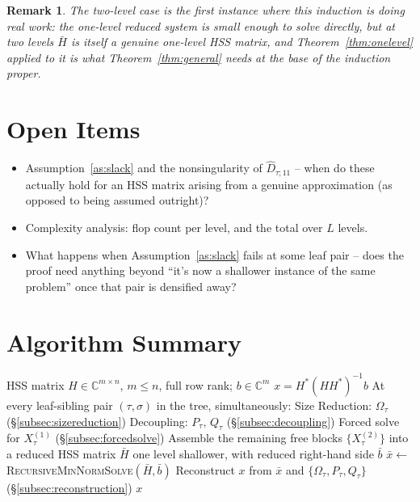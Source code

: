 \documentclass[11pt]{article}
\newtheorem{remark}{Remark}
\begin{document}
\begin{remark}
The two-level case is the first instance where this induction is doing real
work: the one-level reduced system is small enough to solve directly, but at
two levels $\bar H$ is itself a genuine one-level HSS matrix, and
Theorem~\ref{thm:onelevel} applied to it is what Theorem~\ref{thm:general}
needs at the base of the induction proper.
\end{remark}

\section{Open Items}

\begin{itemize}
\item Assumption~\ref{as:slack} and the nonsingularity of $\hat D_{\tau;11}$ --
  when do these actually hold for an HSS matrix arising from a genuine
  approximation (as opposed to being assumed outright)?
\item Complexity analysis: flop count per level, and the total over $L$ levels.
\item What happens when Assumption~\ref{as:slack} fails at some leaf pair --
  does the proof need anything beyond ``it's now a shallower instance of the
  same problem'' once that pair is densified away?
\end{itemize}

\section{Algorithm Summary}

\begin{algorithm}[h]
\caption{Recursive Complete Minimum-Norm HSS Solve}
\label{alg:minnorm}
\begin{algorithmic}[1]
\Require HSS matrix $H\in\mathbb{C}^{m\times n}$, $m\le n$, full row rank; $b\in\mathbb{C}^m$
  \State \Return $x = H^*(HH^*)^{-1}b$ 
\Else
  \State At every leaf-sibling pair $(\tau,\sigma)$ in the tree, simultaneously:
  \State \quad Size Reduction: $\Omega_\tau$ (\S\ref{subsec:sizereduction})
  \State \quad Decoupling: $P_\tau,\,Q_\tau$ (\S\ref{subsec:decoupling})
  \State \quad Forced solve for $X_\tau^{(1)}$ (\S\ref{subsec:forcedsolve})
  \State Assemble the remaining free blocks $\{X_\tau^{(2)}\}$ into a reduced HSS
         matrix $\bar H$ one level shallower, with reduced right-hand side $\bar b$
  \State $\bar x \gets$ \textsc{RecursiveMinNormSolve}$(\bar H,\bar b)$ 
  \State Reconstruct $x$ from $\bar x$ and $\{\Omega_\tau,P_\tau,Q_\tau\}$ (\S\ref{subsec:reconstruction})
  \State \Return $x$
\EndIf
\end{algorithmic}
\end{algorithm}
\end{document}
